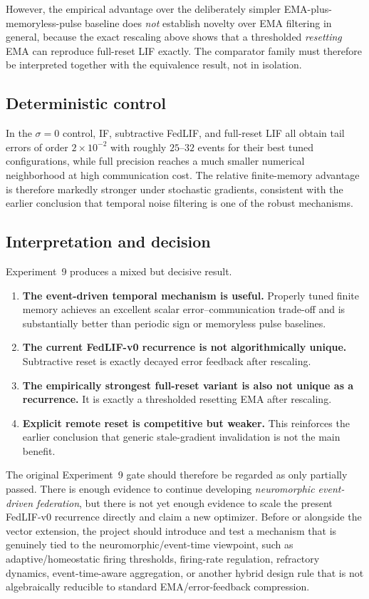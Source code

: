 However, the empirical advantage over the deliberately simpler EMA-plus-memoryless-pulse baseline does \emph{not} establish novelty over EMA filtering in general, because the exact rescaling above shows that a thresholded \emph{resetting} EMA can reproduce full-reset LIF exactly. The comparator family must therefore be interpreted together with the equivalence result, not in isolation.

\subsection{Deterministic control}

In the $\sigma=0$ control, IF, subtractive FedLIF, and full-reset LIF all obtain tail errors of order $2\times10^{-2}$ with roughly $25$--$32$ events for their best tuned configurations, while full precision reaches a much smaller numerical neighborhood at high communication cost. The relative finite-memory advantage is therefore markedly stronger under stochastic gradients, consistent with the earlier conclusion that temporal noise filtering is one of the robust mechanisms.

\subsection{Interpretation and decision}

Experiment~9 produces a mixed but decisive result.
\begin{enumerate}
  \item \textbf{The event-driven temporal mechanism is useful.} Properly tuned finite memory achieves an excellent scalar error--communication trade-off and is substantially better than periodic sign or memoryless pulse baselines.
  \item \textbf{The current FedLIF-v0 recurrence is not algorithmically unique.} Subtractive reset is exactly decayed error feedback after rescaling.
  \item \textbf{The empirically strongest full-reset variant is also not unique as a recurrence.} It is exactly a thresholded resetting EMA after rescaling.
  \item \textbf{Explicit remote reset is competitive but weaker.} This reinforces the earlier conclusion that generic stale-gradient invalidation is not the main benefit.
\end{enumerate}

The original Experiment~9 gate should therefore be regarded as only partially passed. There is enough evidence to continue developing \emph{neuromorphic event-driven federation}, but there is not yet enough evidence to scale the present FedLIF-v0 recurrence directly and claim a new optimizer. Before or alongside the vector extension, the project should introduce and test a mechanism that is genuinely tied to the neuromorphic/event-time viewpoint, such as adaptive/homeostatic firing thresholds, firing-rate regulation, refractory dynamics, event-time-aware aggregation, or another hybrid design rule that is not algebraically reducible to standard EMA/error-feedback compression.
